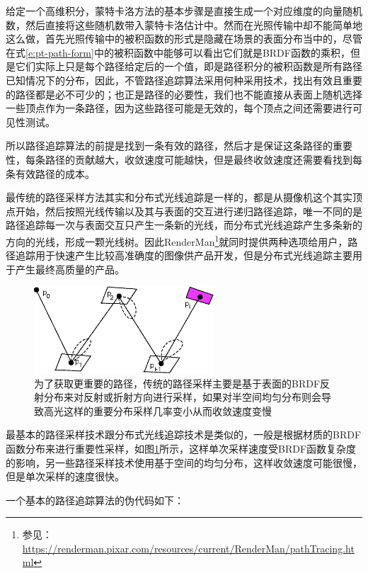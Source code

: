 给定一个高维积分，蒙特卡洛方法的基本步骤是直接生成一个对应维度的向量随机数，然后直接将这些随机数带入蒙特卡洛估计中。然而在光照传输中却不能简单地这么做，首先光照传输中的被积函数的形式是隐藏在场景的表面分布当中的，尽管在式\ref{e:pt-path-form}中的被积函数中能够可以看出它们就是BRDF函数的乘积，但是它们实际上只是每个路径给定后的一个值，即是路径积分的被积函数是所有路径已知情况下的分布，因此，不管路径追踪算法采用何种采用技术，找出有效且重要的路径都是必不可少的；也正是路径的必要性，我们也不能直接从表面上随机选择一些顶点作为一条路径，因为这些路径可能是无效的，每个顶点之间还需要进行可见性测试。

所以路径追踪算法的前提是找到一条有效的路径，然后才是保证这条路径的重要性，每条路径的贡献越大，收敛速度可能越快，但是最终收敛速度还需要看找到每条有效路径的成本。

最传统的路径采样方法其实和分布式光线追踪是一样的，都是从摄像机这个其实顶点开始，然后按照光线传输以及其与表面的交互进行递归路径追踪，唯一不同的是路径追踪每一次与表面交互只产生一条新的光线，而分布式光线追踪产生多条新的方向的光线，形成一颗光线树。因此RenderMan\footnote{参见：\url{https://renderman.pixar.com/resources/current/RenderMan/pathTracing.html}}就同时提供两种选项给用户，路径追踪用于快速产生比较高准确度的图像供产品开发，但是分布式光线追踪主要用于产生最终高质量的产品。

\begin{figure}
\sidecaption
	\includegraphics[width=0.6\textwidth]{figures/pt/path-tracing}
	\caption{为了获取更重要的路径，传统的路径采样主要是基于表面的BRDF反射分布来对反射或折射方向进行采样，如果对半空间均匀分布则会导致高光这样的重要分布采样几率变小从而收敛速度变慢}
	\label{f:pt-path-sampling}
\end{figure}

最基本的路径采样技术跟分布式光线追踪技术是类似的，一般是根据材质的BRDF函数分布来进行重要性采样，如图\ref{f:pt-path-sampling}所示，这样单次采样速度受BRDF函数复杂度的影响，另一些路径采样技术使用基于空间的均匀分布，这样收敛速度可能很慢，但是单次采样的速度很快。

一个基本的路径追踪算法的伪代码如下：


